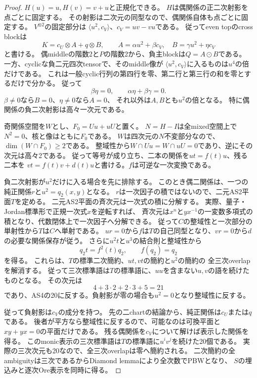 \begin{proof}
$H(u)=u,H(v)=v+u$と正規化できる。
$H$は偶関係の正二次射影を点ごとに固定する。
その射影は二次元の同型なので、偶関係自体も点ごとに固定する。
$V^{\otimes2}$の固定部分は
$\langle u^2,c_V\rangle$、$c_V=uv-vu$である。
従ってeven topのcross blockは
\[
 K=c_U\otimes A+q\otimes B,\qquad
 A=\alpha u^2+\beta c_V,\quad B=\gamma u^2+\eta c_V
\]
と書ける。
偶middleの階数2と$P$の階数2から、負主blockは$Q=A\mathbin{\odot}B$である。
一方、cyclicな負二元四次tensorで、そのmiddle像が
$\langle u^2,c_V\rangle$に入るものは$u^4$の倍だけである。
これは一般cyclic行列の第四行を零、第二行と第三行の和を零とするだけで分かる。
従って
\[
 \beta\eta=0,\qquad\alpha\eta+\beta\gamma=0.
\]
$\beta\ne0$なら$B=0$、$\eta\ne0$なら$A=0$、
それ以外は$A,B$とも$u^2$の倍となる。
特に偶関係の負二次射影は高々一次元である。

奇関係空間を$W$とし、$F_0=Uu+uU$と置く。
$N=H-I$は全mixed空間上で$N^2=0$、核と像はともに$F_0$である。
$W$は四次元の$N$不変部分なので、$\dim(W\cap F_0)\ge2$である。
整域性から$W\cap Uu=W\cap uU=0$であり、逆にその次元は高々2である。
従って等号が成り立ち、二本の関係を$ut=f(t)u$、残る二本を
$vt=f(t)v+d(t)u$と書ける。$f$は可逆な一次変換である。

負二次射影が$u^2$だけに入る場合を先に排除する。
このとき偶二関係は、一つの純正関係$r$と$u^2=q_2(x,y)$となる。
$r$は一次因子の積ではないので、二元AS2平面$T$を定める。
二元AS2平面の斉次元は一次式の積に分解する。
実際、量子・Jordan標準形で正規一次式$x$を逆転すれば、
斉次元は$x^n$と$y x^{-1}$の一変数多項式の積となり、代数閉体上で一次因子へ分解できる。
従って$C$の整域性と一次部分の単射性から$T$は$C$へ単射である。
$ur=0$から$f$は$T$の自己同型となり、$vr=0$から$d$の必要な関係保存が従う。
さらに$u^2t$と$u^3$の結合則と整域性から
\[
 q_2t=f^2(t)q_2,\qquad f(q_2)=q_2
\]
を得る。
これらは、$T$の標準二次簡約、$ut,vt$の簡約と$u^2$の簡約の
全三次overlapを解消する。
従って三次標準語は$T$の標準語に、$uu$を含まない$u,v$の語を続けたものとなる。
その次元は
\[
 4+3\cdot2+2\cdot3+5=21
\]
であり、AS4の20に反する。負射影が零の場合も$u^2=0$となり整域性に反する。

従って負射影は$c_V$の成分を持つ。
先の二chartの結論から、純正関係は$c_U$または$q$である。
後者が平方なら整域性に反するので、可能なのは可換平面と$xy+yx=0$の平面だけである。
残る偶関係を$c_V$について解けば表示した関係を得る。
このmonic表示の三次標準語は$T$の標準語に$u^iv^j$を続けた20個である。
実際の三次次元も20なので、全三次overlapは零へ簡約される。
二次簡約の全ambiguityは三次であるからDiamond lemmaにより全次数でPBWとなり、
$S$の埋込みと逐次Ore表示を同時に得る。
\end{proof}

